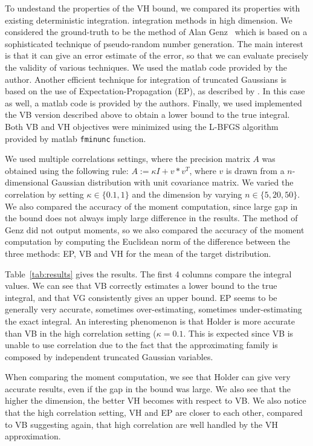 \documentclass{article} %
\begin{document}
To undestand the properties of the VH bound, we compared its properties with existing deterministic integration. integration methods in high dimension. We considered the ground-truth to be the method of Alan Genz~\citep{genz2009computation}
which is based on a sophisticated technique of pseudo-random number generation. The main interest is that it can give an error estimate of the error, so that we can evaluate precisely the validity of various techniques. We used the matlab code provided by the author.
Another efficient technique for integration of truncated Gaussians is based on the use of Expectation-Propagation (EP), as
described by \citet{Cunningham-et-al-Gaussian-EP2012}. In this case as well, a matlab code is provided by the authors. 
Finally, we used implemented the VB version described above to obtain a lower bound to the true integral. 
Both VB and VH objectives were minimized using the L-BFGS algorithm provided by matlab \texttt{fminunc} function.

We used multiple correlations settings, where the precision matrix $A$ was obtained using the following rule:
$A:=\kappa I + v*v^T $, where $v$ is drawn from a $n$-dimensional Gaussian distribution with unit covariance matrix.
We varied the correlation by setting $\kappa\in\{0.1,1\}$ and the dimension by varying $n\in\{5, 20, 50\}$.
We also compared the accuracy of the moment computation, since large gap in the bound does not always imply large difference in the results. The method of Genz did not output moments, so we also compared the accuracy of the moment computation by computing the Euclidean norm of the difference between the three methods: EP, VB and VH for the mean
of the target distribution. %

 Table~\ref{tab:results} gives the results. The first 4 columns compare the integral values. We can see that VB correctly estimates a lower bound to the true integral, and that VG consistently gives an upper bound. EP seems to be generally very accurate, sometimes over-estimating, sometimes under-estimating the exact integral. An interesting phenomenon is that Holder is more accurate than VB in the high correlation setting ($\kappa=0.1$. This is expected since VB is unable to use correlation due to the fact that the 
 approximating family is composed by independent truncated Gaussian variables.

When comparing the moment computation, we see that Holder can give very accurate results, even if the gap in the bound was large. We also see that the higher the dimension, the better VH becomes with respect to VB. We also notice that the high correlation setting, VH and EP are closer to each other, compared to VB suggesting again, that high correlation are well handled by the VH approximation. 
\end{document}
